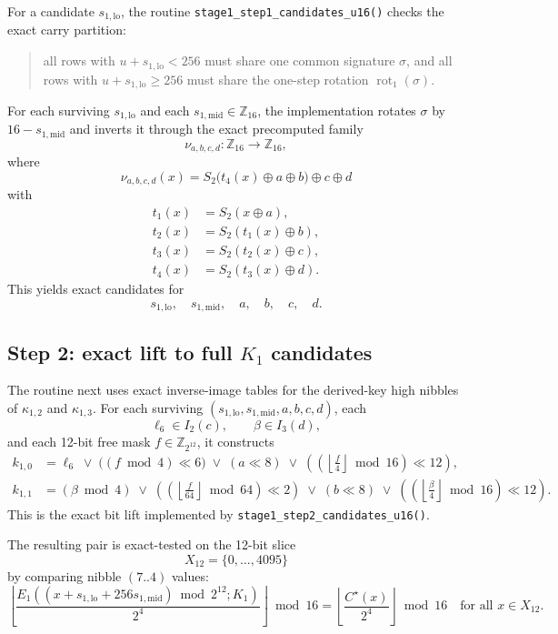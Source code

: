 \documentclass[11pt]{article}
\newcommand{\Z}[1]{\mathbb{Z}_{#1}}
\begin{document}
For a candidate $s_{1,\mathrm{lo}}$, the routine \texttt{stage1\_step1\_candidates\_u16()} checks the exact carry partition:
\begin{quote}
all rows with $u+s_{1,\mathrm{lo}}<256$ must share one common signature $\sigma$, and all rows with $u+s_{1,\mathrm{lo}}\ge 256$ must share the one-step rotation $\operatorname{rot}_1(\sigma)$.
\end{quote}
For each surviving $s_{1,\mathrm{lo}}$ and each $s_{1,\mathrm{mid}}\in\Z{16}$, the implementation rotates $\sigma$ by $16-s_{1,\mathrm{mid}}$ and inverts it through the exact precomputed family
\[
\nu_{a,b,c,d}:\Z{16}\to\Z{16},
\]
where
\[
\nu_{a,b,c,d}(x)=S_2\bigl(t_4(x)\oplus a\oplus b\bigr)\oplus c\oplus d
\]
with
\begin{align*}
t_1(x)&=S_2(x\oplus a),\\
t_2(x)&=S_2(t_1(x)\oplus b),\\
t_3(x)&=S_2(t_2(x)\oplus c),\\
t_4(x)&=S_2(t_3(x)\oplus d).
\end{align*}
This yields exact candidates for
\[
s_{1,\mathrm{lo}},\quad s_{1,\mathrm{mid}},\quad a,\quad b,\quad c,\quad d.
\]

\subsection{Step 2: exact lift to full \texorpdfstring{$K_1$}{K1} candidates}
The routine next uses exact inverse-image tables for the derived-key high nibbles of $\kappa_{1,2}$ and $\kappa_{1,3}$. For each surviving $(s_{1,\mathrm{lo}},s_{1,\mathrm{mid}},a,b,c,d)$, each
\[
\ell_6\in I_2(c),\qquad \beta\in I_3(d),
\]
and each 12-bit free mask $f\in\Z{2^{12}}$, it constructs
\begin{align}
k_{1,0} &=
\ell_6
\;\vee\;
\bigl((f\bmod 4)\ll 6\bigr)
\;\vee\;
(a\ll 8)
\;\vee\;
\left(\left(\left\lfloor\frac{f}{4}\right\rfloor \bmod 16\right)\ll 12\right), \label{eq:k10-lift}\\
k_{1,1} &=
(\beta\bmod 4)
\;\vee\;
\left(\left(\left\lfloor\frac{f}{64}\right\rfloor \bmod 64\right)\ll 2\right)
\;\vee\;
(b\ll 8)
\;\vee\;
\left(\left(\left\lfloor\frac{\beta}{4}\right\rfloor \bmod 16\right)\ll 12\right). \label{eq:k11-lift}
\end{align}
This is the exact bit lift implemented by \texttt{stage1\_step2\_candidates\_u16()}.

The resulting pair is exact-tested on the 12-bit slice
\[
X_{12}=\{0,\dots,4095\}
\]
by comparing nibble $(7..4)$ values:
\[
\left\lfloor \frac{E_1((x+s_{1,\mathrm{lo}}+256s_{1,\mathrm{mid}})\bmod 2^{12};K_1)}{2^4}\right\rfloor \bmod 16
=
\left\lfloor \frac{C^\star(x)}{2^4}\right\rfloor \bmod 16
\quad\text{for all }x\in X_{12}.
\]
\end{document}
